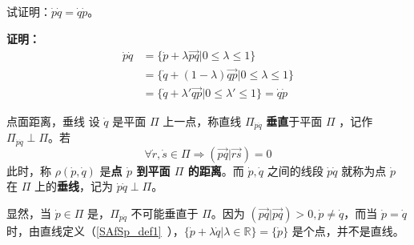\begin{example}{}
试证明：$\dot p\dot q=\dot q\dot p$。

\textbf{证明：}
\begin{equation}
\begin{aligned}
\dot p\dot q&=\{\dot p+\lambda\overrightarrow{pq}|0\leq\lambda\leq1\}\\
&=\{\dot q+(1-\lambda)\overrightarrow{qp}|0\leq\lambda\leq1\}\\
&=\{\dot q+\lambda'\overrightarrow{qp}|0\leq\lambda'\leq1\}=\dot q\dot p
\end{aligned}
\end{equation}
\end{example}
\begin{definition}{点面距离，垂线}
设 $\dot q$ 是平面 $\Pi$ 上一点，称直线 $\Pi_{\dot p\dot q}$ \textbf{垂直}于平面 $\Pi$ ，记作 $\Pi_{\dot p\dot q}\perp\Pi$。若
\begin{equation}
\forall \dot r,\dot s\in\Pi\Rightarrow (\overrightarrow{pq}|\overrightarrow{rs})=0
\end{equation}
此时，称 $\rho(\dot p,\dot q)$ 是\textbf{点 $\dot p$ 到平面 $\Pi$ 的距离}。而 $\dot p,\dot q$ 之间的线段 $\dot p\dot q$ 就称为点 $\dot p$ 在 $\Pi$ 上的\textbf{垂线}，记为 $\dot p\dot q\perp\Pi$。
\end{definition}
显然，当 $\dot p\in\Pi$ 是，$\Pi_{\dot p\dot q}$ 不可能垂直于 $\Pi$。因为 $(\overrightarrow{pq}|\overrightarrow{pq})>0,\dot p\neq \dot q$，而当 $\dot p=\dot q$ 时，由直线定义（\autoref{SAfSp_def1}~），$\{\dot p+\lambda\dot q|\lambda\in \mathbb R\}=\{\dot p\}$ 是个点，并不是直线。